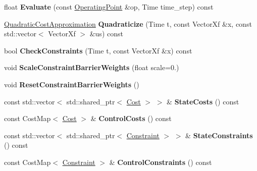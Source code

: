 \begin{DoxyCompactItemize}
\item 
float {\bfseries Evaluate} (const \hyperlink{structilqgames_1_1_operating_point}{Operating\+Point} \&op, Time time\+\_\+step) const \hypertarget{classilqgames_1_1_player_cost_a8c7fc17986dfb478df17cf9f8da85926}{}\label{classilqgames_1_1_player_cost_a8c7fc17986dfb478df17cf9f8da85926}

\item 
\hyperlink{structilqgames_1_1_quadratic_cost_approximation}{Quadratic\+Cost\+Approximation} {\bfseries Quadraticize} (Time t, const Vector\+Xf \&x, const std\+::vector$<$ Vector\+Xf $>$ \&us) const \hypertarget{classilqgames_1_1_player_cost_ad3962847f8eda8bcfecf2096e6abccb6}{}\label{classilqgames_1_1_player_cost_ad3962847f8eda8bcfecf2096e6abccb6}

\item 
bool {\bfseries Check\+Constraints} (Time t, const Vector\+Xf \&x) const \hypertarget{classilqgames_1_1_player_cost_aecd3478584357f4ea5d743c14b842e71}{}\label{classilqgames_1_1_player_cost_aecd3478584357f4ea5d743c14b842e71}

\item 
void {\bfseries Scale\+Constraint\+Barrier\+Weights} (float scale=0.)\hypertarget{classilqgames_1_1_player_cost_a01099622def541cf226c94140c38d485}{}\label{classilqgames_1_1_player_cost_a01099622def541cf226c94140c38d485}

\item 
void {\bfseries Reset\+Constraint\+Barrier\+Weights} ()\hypertarget{classilqgames_1_1_player_cost_add7445e01947fcaaf9d5f1e392471970}{}\label{classilqgames_1_1_player_cost_add7445e01947fcaaf9d5f1e392471970}

\item 
const std\+::vector$<$ std\+::shared\+\_\+ptr$<$ \hyperlink{classilqgames_1_1_cost}{Cost} $>$ $>$ \& {\bfseries State\+Costs} () const \hypertarget{classilqgames_1_1_player_cost_adfb1861f05ba2efa163e7a28670f0585}{}\label{classilqgames_1_1_player_cost_adfb1861f05ba2efa163e7a28670f0585}

\item 
const Cost\+Map$<$ \hyperlink{classilqgames_1_1_cost}{Cost} $>$ \& {\bfseries Control\+Costs} () const \hypertarget{classilqgames_1_1_player_cost_a4fa0717c227acf2773deda56eaf62e99}{}\label{classilqgames_1_1_player_cost_a4fa0717c227acf2773deda56eaf62e99}

\item 
const std\+::vector$<$ std\+::shared\+\_\+ptr$<$ \hyperlink{classilqgames_1_1_constraint}{Constraint} $>$ $>$ \& {\bfseries State\+Constraints} () const \hypertarget{classilqgames_1_1_player_cost_ac6ef894e71fd9524bd6aa6d3982f415a}{}\label{classilqgames_1_1_player_cost_ac6ef894e71fd9524bd6aa6d3982f415a}

\item 
const Cost\+Map$<$ \hyperlink{classilqgames_1_1_constraint}{Constraint} $>$ \& {\bfseries Control\+Constraints} () const \hypertarget{classilqgames_1_1_player_cost_acf0081bb561f71522cd9716a9e34eb60}{}\label{classilqgames_1_1_player_cost_acf0081bb561f71522cd9716a9e34eb60}

\end{DoxyCompactItemize}


